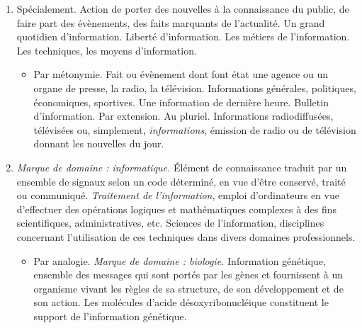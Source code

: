 \begin{graybox}
\begin{enumerate}
\begin{itemize}
            \item Au singulier, dans un sens collectif. Ensemble de données, de
            connaissances réunies sur un sujet. Il s'est lancé dans cette
            entreprise avec une information insuffisante. Ces travaux témoignent
            d'une information très étendue.

            \item \textit{Marque de domaine : droit.} Enquête menée par le
            juge d'instruction ou par des officiers de police judiciaire en
            vue d'établir la preuve d'une infraction et d'en découvrir les
            auteurs. Information judiciaire. Procéder à une information.
            Demander un supplément d'information. Ouvrir, clore une
            information. Information contre X.
        \end{itemize}

        \item Spécialement. Action de porter des nouvelles à la connaissance
        du public, de faire part des évènements, des faits marquants de
        l'actualité. Un grand quotidien d'information. Liberté d'information.
        Les métiers de l'information. Les techniques, les moyens d'information.
        \begin{itemize}
            \item Par métonymie. Fait ou évènement dont font état une agence
            ou un organe de presse, la radio, la télévision. Informations
            générales, politiques, économiques, sportives. Une information de
            dernière heure. Bulletin d'information. Par extension. Au pluriel.
            Informations radiodiffusées, télévisées ou, simplement,
            \textit{informations}, émission de radio ou de télévision donnant
            les nouvelles du jour.
        \end{itemize}

        \item \textit{Marque de domaine : informatique.} Élément de
        connaissance traduit par un ensemble de signaux selon un code
        déterminé, en vue d'être conservé, traité ou communiqué.
        \textit{Traitement de l'information}, emploi d'ordinateurs en vue
        d'effectuer des opérations logiques et mathématiques complexes à des
        fins scientifiques, administratives, etc. Sciences de l'information,
        disciplines concernant l'utilisation de ces techniques dans divers
        domaines professionnels.
        \begin{itemize}
            \item Par analogie. \textit{Marque de domaine : biologie.}
            Information génétique, ensemble des messages qui sont portés par
            les gènes et fournissent à un organisme vivant les règles de sa
            structure, de son développement et de son action. Les molécules
            d'acide désoxyribonucléique constituent le support de
            l'information génétique.
        \end{itemize}
    \end{enumerate}


\end{graybox}
